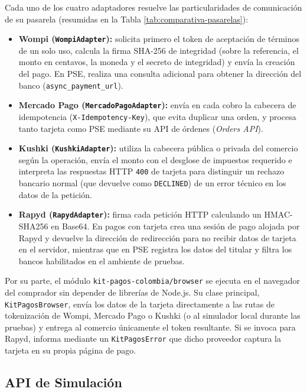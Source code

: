 Cada uno de los cuatro adaptadores resuelve las particularidades de comunicación de su pasarela (resumidas en la Tabla \ref{tab:comparativa-pasarelas}):
\begin{itemize}
    \item \textbf{Wompi (\texttt{WompiAdapter}):} solicita primero el token de aceptación de términos de un solo uso, calcula la firma SHA-256 de integridad (sobre la referencia, el monto en centavos, la moneda y el secreto de integridad) y envía la creación del pago. En PSE, realiza una consulta adicional para obtener la dirección del banco (\texttt{async\_payment\_url}).
    \item \textbf{Mercado Pago (\texttt{MercadoPagoAdapter}):} envía en cada cobro la cabecera de idempotencia (\texttt{X-Idempotency-Key}), que evita duplicar una orden, y procesa tanto tarjeta como PSE mediante su API de órdenes (\textit{Orders API}).
    \item \textbf{Kushki (\texttt{KushkiAdapter}):} utiliza la cabecera pública o privada del comercio según la operación, envía el monto con el desglose de impuestos requerido e interpreta las respuestas HTTP \texttt{400} de tarjeta para distinguir un rechazo bancario normal (que devuelve como \texttt{DECLINED}) de un error técnico en los datos de la petición.
    \item \textbf{Rapyd (\texttt{RapydAdapter}):} firma cada petición HTTP calculando un HMAC-SHA256 en Base64. En pagos con tarjeta crea una sesión de pago alojada por Rapyd y devuelve la dirección de redirección para no recibir datos de tarjeta en el servidor, mientras que en PSE registra los datos del titular y filtra los bancos habilitados en el ambiente de pruebas.
\end{itemize}

Por su parte, el módulo \texttt{kit-pagos-colombia/browser} se ejecuta en el navegador del comprador sin depender de librerías de Node.js. Su clase principal, \texttt{KitPagosBrowser}, envía los datos de la tarjeta directamente a las rutas de tokenización de Wompi, Mercado Pago o Kushki (o al simulador local durante las pruebas) y entrega al comercio únicamente el token resultante. Si se invoca para Rapyd, informa mediante un \texttt{KitPagosError} que dicho proveedor captura la tarjeta en su propia página de pago.

\subsection{API de Simulación}

